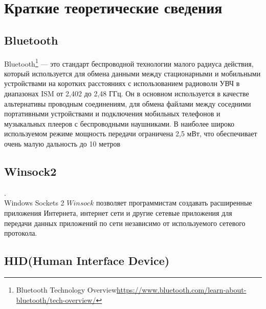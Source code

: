 
\section{Краткие теоретические сведения}
\subsection{Bluetooth}
Bluetooth\footnote{Bluetooth Technology Overview\href{https://www.bluetooth.com/learn-about-bluetooth/tech-overview/}{https://www.bluetooth.com/learn-about-bluetooth/tech-overview/}}
— это стандарт беспроводной технологии малого радиуса действия, который используется для обмена данными между стационарными и мобильными устройствами на коротких расстояниях с использованием радиоволн УВЧ в диапазонах ISM от 2,402 до 2,48 ГГц.
Он в основном используется в качестве альтернативы проводным соединениям, для обмена файлами между соседними портативными устройствами и подключения мобильных телефонов и музыкальных плееров с беспроводными наушниками.
В наиболее широко используемом режиме мощность передачи ограничена 2,5 мВт, что обеспечивает очень малую дальность до 10 метров


\subsection{Winsock2}
.\\
\quad Windows Sockets 2 \(Winsock\) позволяет программистам создавать расширенные приложения Интернета, интернет сети и другие сетевые приложения для передачи данных приложений по сети независимо от используемого сетевого протокола.

\par

\subsection{HID(Human Interface Device)}
\hypertarget{hid_theoretical_inf}{}

